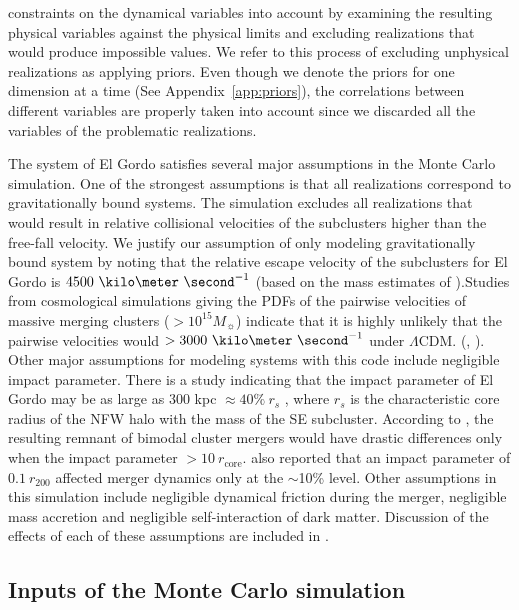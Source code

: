constraints on the dynamical variables into account by
examining the resulting physical variables against the physical limits and
excluding realizations that would produce impossible values. We refer to this
process of excluding unphysical realizations as applying priors. 
Even though we denote the priors for one dimension at a time (See Appendix~\ref{app:priors}), 
the correlations between different variables are properly taken into account
since we discarded all the variables of the problematic
realizations.\par 
The system of El Gordo satisfies several major assumptions in the Monte Carlo
simulation.
One of the strongest assumptions is that all realizations correspond to
gravitationally bound systems. The simulation excludes all realizations
that would result in relative collisional velocities of the subclusters
higher than the free-fall velocity. We justify our assumption of only
modeling gravitationally bound system by noting that the relative escape
velocity of the subclusters for El Gordo is
$4500~\kilo\meter~\second^{-1}$ (based on the mass estimates of
\cite{Jee13}).Studies from cosmological simulations giving the PDFs of the pairwise velocities of massive merging clusters ($>
10^{15} M_{\sun}$) indicate that it is highly unlikely that the pairwise
velocities would $> 3000~\kilo \meter~\second^{-1}$ under $\Lambda$CDM.
(\citealt{Thompson12}, \citealt{Lee2010}).  Other major assumptions for
modeling systems with this code include negligible impact parameter. There
is a study indicating that the impact parameter of El Gordo
may be as large as $300$ kpc $ \approx 40\%~r_s$ \citep{Molnar14},
where $r_s$ is the characteristic core
radius of the NFW halo with the mass of the SE subcluster. According to
\cite{Ricker98}, the resulting remnant of bimodal cluster mergers would
have drastic differences only when the impact parameter $> 10~ r_{\text{core}}$.
\cite{Mastropietro2008a} also reported that an impact parameter of $0.1~
r_{200}$ affected merger dynamics only at the $\sim$10\% level.   
Other assumptions in this simulation include negligible dynamical friction
during the merger, negligible mass accretion and negligible self-interaction
of dark matter. Discussion of the effects of each of these assumptions are
included in .  
\par
\subsection{Inputs of the Monte Carlo simulation} \label{sec: inputs}
\setcounter{table}{0} 

